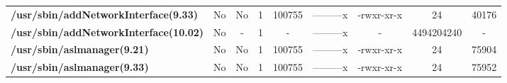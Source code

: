 \begin{center}
{\begin{tabular}{|>{\bfseries} l | C | C | C | C | C | C | C | C |}
					/usr/sbin/addNetworkInterface(9.33) & No & No & \color{green}1 & \color{red}100755 & \color{green}---------x & \color{red}-rwxr-xr-x & \color{green}24 & \color{red}40176\\ 
					/usr/sbin/addNetworkInterface(10.02) & No & - & 1 & - & ---------x & - & 4494204240 & -\\ 
					/usr/sbin/aslmanager(9.21) & No & No & \color{green}1 & \color{red}100755 & \color{green}---------x & \color{red}-rwxr-xr-x & \color{green}24 & \color{red}75904\\ 
					/usr/sbin/aslmanager(9.33) & No & No & \color{green}1 & \color{red}100755 & \color{green}---------x & \color{red}-rwxr-xr-x & \color{green}24 & \color{red}75952\\ 

			\end{tabular}
		}
	\end{center}


